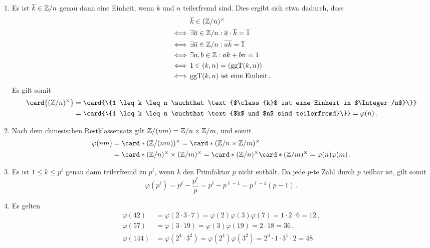 \documentclass[a4paper, 10pt]{scrartcl}
\begin{document}
\begin{solution}
  \begin{enumerate}
    \item
      Es ist $\overline{k} \in \mathbb{Z}/n$ genau dann eine Einheit, wenn $k$ und $n$ teilerfremd sind.
      Dies ergibt sich etwa dadurch, dass
      \begin{align*}
            &\, \overline{k} \in (\mathbb{Z}/n)^{\times}  \\
        \iff&\, \exists \overline{a} \in \mathbb{Z}/n : \overline{a} \cdot \overline{k} = \overline{1}  \\
        \iff&\, \exists \overline{a} \in \mathbb{Z}/n : \overline{ak} = \overline{1}  \\
        \iff&\, \exists a, b \in \mathbb{Z} : ak + bn = 1 \\
        \iff&\, 1 \in (k,n) = (\operatorname{ggT}(k,n)) \\
        \iff&\, \text{$\operatorname{ggT}(k,n)$ ist eine Einheit} \,.
      \end{align*}
      Es gilt somit
      \begin{align*}
            \card{\unitgroup{(\Integer/n)}}
        &=  \card{\{1 \leq k \leq n \suchthat \text{$\class{k}$ ist eine Einheit in $\Integer/n$}\}}  \\
        &=  \card{\{1 \leq k \leq n \suchthat \text{$k$ und $n$ sind teilerfremd}\}}
         =  \varphi(n) \,.
      \end{align*}
    \item
      Nach dem chinesischen Restklassensatz gilt $\mathbb{Z}/(nm) = \mathbb{Z}/n \times \mathbb{Z}/m$, und somit
      \begin{align*}
            \varphi(nm)
        &=  \card*{\unitgroup{(\Integer/(nm))}}
         =  \card*{\unitgroup{(\Integer/n \times \Integer/m)}} \\
        &=  \card*{\unitgroup{(\Integer/n)} \times \unitgroup{(\Integer/m)}}
         =  \card*{\unitgroup{(\Integer/n)}} \card*{\unitgroup{(\Integer/m)}}
         =  \varphi(n) \varphi(m) \,.
      \end{align*}
    \item
      Es ist $1 \leq k \leq p^\ell$ genau dann teilerfremd zu $p^\ell$, wenn $k$ den Primfaktor $p$ nicht enthält.
      Da jede $p$-te Zahl durch $p$ teilbar ist, gilt somit
      \[
          \varphi(p^\ell)
        = p^\ell - \frac{p^\ell}{p}
        = p^\ell - p^{\ell-1}
        = p^{\ell-1}(p-1) \,.
      \]
    \item
      Es gelten
      \begin{align*}
            \varphi(42)
        &=  \varphi(2 \cdot 3 \cdot 7)
         =  \varphi(2) \varphi(3) \varphi(7)
         =  1 \cdot 2 \cdot 6
         =  12 \,,
        \\
            \varphi(57)
        &=  \varphi(3 \cdot 19)
         =  \varphi(3) \varphi(19)
         =  2 \cdot 18
         =  36 \,,
        \\
            \varphi(144)
        &=  \varphi(2^4 \cdot 3^2)
        =   \varphi(2^4) \varphi(3^2)
        =   2^3 \cdot 1 \cdot 3^1 \cdot 2
        =   48 \,.
      \end{align*}


\end{enumerate}
\end{solution}
\end{document}
